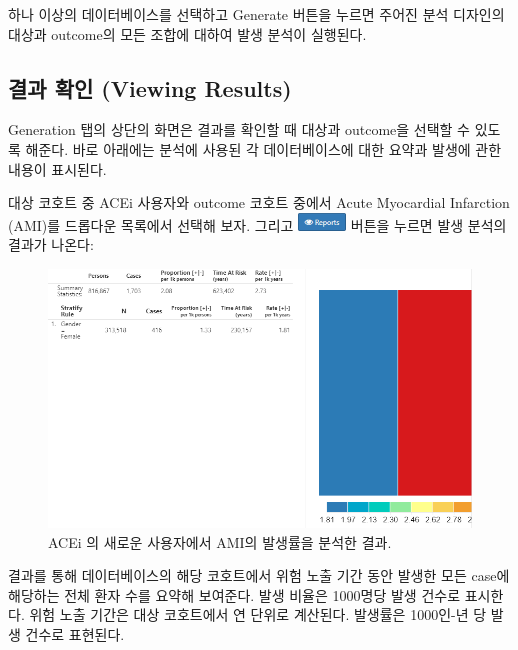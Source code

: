 \documentclass[11pt]{book}
\theoremstyle{definition}
\theoremstyle{definition}
\theoremstyle{definition}
\theoremstyle{remark}
\begin{document}
하나 이상의 데이터베이스를 선택하고 Generate 버튼을 누르면 주어진 분석
디자인의 대상과 outcome의 모든 조합에 대하여 발생 분석이 실행된다.

\subsection{결과 확인 (Viewing Results)}\label{--viewing-results-1}

Generation 탭의 상단의 화면은 결과를 확인할 때 대상과 outcome을 선택할
수 있도록 해준다. 바로 아래에는 분석에 사용된 각 데이터베이스에 대한
요약과 발생에 관한 내용이 표시된다.

대상 코호트 중 ACEi 사용자와 outcome 코호트 중에서 Acute Myocardial
Infarction (AMI)를 드롭다운 목록에서 선택해 보자. 그리고
\includegraphics{images/Characterization/atlasIncidenceReportButton.png}
버튼을 누르면 발생 분석의 결과가 나온다:

\begin{figure}

{\centering \includegraphics[width=1\linewidth]{images/Characterization/atlasIncidenceResults} 

}

\caption{ACEi 의 새로운 사용자에서 AMI의 발생률을 분석한 결과.}\label{fig:atlasIncidenceResults}
\end{figure}

결과를 통해 데이터베이스의 해당 코호트에서 위험 노출 기간 동안 발생한
모든 case에 해당하는 전체 환자 수를 요약해 보여준다. 발생 비율은
1000명당 발생 건수로 표시한다. 위험 노출 기간은 대상 코호트에서 연
단위로 계산된다. 발생률은 1000인-년 당 발생 건수로 표현된다.
\end{document}

